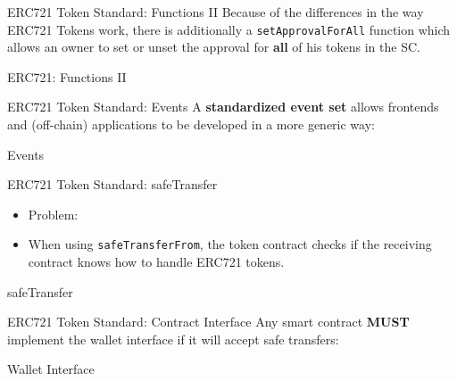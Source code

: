 \documentclass[handout]{beamer}
\begin{document}
\begin{frame}{ERC721 Token Standard: Functions II}
Because of the differences in the way ERC721 Tokens work, there is additionally a \texttt{setApprovalForAll} function which allows an owner to set or unset the approval for \textbf{all} of his tokens in the SC. 
\vspace{1em}
	\begin{samplecode}{ERC721: Functions II}
		
	\end{samplecode}
\end{frame}

\begin{frame}{ERC721 Token Standard: Events}
\vspace{0.5em}
	A \textbf{standardized event set} allows frontends and (off-chain) applications to be developed in a more generic way:
\vspace{1em}
	\begin{samplecode}{Events}
		
	\end{samplecode}
\end{frame}

\begin{frame}{ERC721 Token Standard: safeTransfer}
\begin{itemize}
	\item Problem:
	\item When using \texttt{safeTransferFrom}, the token contract checks if the receiving contract knows how to handle ERC721 tokens. 
\end{itemize}
\vspace{1em}
	\begin{samplecode}{safeTransfer}
		
	\end{samplecode}
\end{frame}


\begin{frame}{ERC721 Token Standard: Contract Interface}
\vspace{0.5em}
	Any smart contract \textbf{MUST} implement the wallet interface if it will accept safe transfers:
\vspace{1em}
	\begin{samplecode}{Wallet Interface}
		
	\end{samplecode}
\end{frame}
\end{document}
